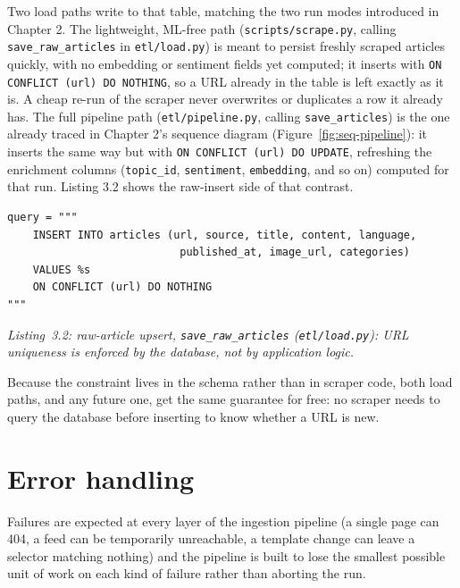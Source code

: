 Two load paths write to that table, matching the two run modes introduced in Chapter 2. The lightweight, ML-free path (\texttt{scripts/scrape.py}, calling \texttt{save\_raw\_articles} in \texttt{etl/load.py}) is meant to persist freshly scraped articles quickly, with no embedding or sentiment fields yet computed; it inserts with \texttt{ON CONFLICT (url) DO NOTHING}, so a URL already in the table is left exactly as it is. A cheap re-run of the scraper never overwrites or duplicates a row it already has. The full pipeline path (\texttt{etl/pipeline.py}, calling \texttt{save\_articles}) is the one already traced in Chapter 2's sequence diagram (Figure~\ref{fig:seq-pipeline}): it inserts the same way but with \texttt{ON CONFLICT (url) DO UPDATE}, refreshing the enrichment columns (\texttt{topic\_id}, \texttt{sentiment}, \texttt{embedding}, and so on) computed for that run. Listing 3.2 shows the raw-insert side of that contrast.

\begin{verbatim}
query = """
    INSERT INTO articles (url, source, title, content, language,
                           published_at, image_url, categories)
    VALUES %s
    ON CONFLICT (url) DO NOTHING
"""
\end{verbatim}
\begin{center}
\textit{Listing~3.2: raw-article upsert, \texttt{save\_raw\_articles} (\texttt{etl/load.py}): URL uniqueness is enforced by the database, not by application logic.}
\end{center}

Because the constraint lives in the schema rather than in scraper code, both load paths, and any future one, get the same guarantee for free: no scraper needs to query the database before inserting to know whether a URL is new.

\section{Error handling}
\label{sec:error-handling}
Failures are expected at every layer of the ingestion pipeline (a single page can 404, a feed can be temporarily unreachable, a template change can leave a selector matching nothing) and the pipeline is built to lose the smallest possible unit of work on each kind of failure rather than aborting the run.


